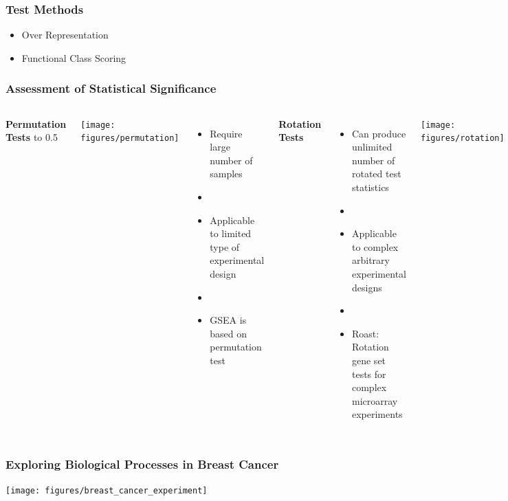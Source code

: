 \documentclass[9pt,t]{beamer}
\begin{document}
\begin{frame}
\frametitle{Test Methods}
		\begin{itemize}
		\item Over Representation
		\item Functional Class Scoring
		\end{itemize}
\end{frame}


\begin{frame}
	\frametitle{Assessment of Statistical Significance}
	\vspace{0.1cm}
	\begin{columns}
	\centering
    \textbf{\color{oxygenpurple} Permutation Tests}
	\vbox to 0.5\textheight
	{
	\vspace{0.02\textwidth}
	\centering
    \texttt{[image: figures/permutation]}                
	\vspace{0.02cm}
	\begin{itemize}
		\item Require large number of samples 
		\item[]
		\item Applicable to limited type of experimental design
		\item[]
		\item GSEA is based on permutation test
		\end{itemize}
    }                       
	\centering
	{\color{oxygenpurple}\textbf{Rotation Tests}}
	\begin{itemize}
	\item Can produce unlimited number of rotated test statistics
	\item[]
	\item Applicable to complex arbitrary experimental designs
	\item[]	
	\item Roast: Rotation gene set tests for complex microarray experiments
	\end{itemize}
	\vspace{0.02cm}
	\texttt{[image: figures/rotation]}
	\end{columns}
\end{frame}

\begin{frame}
	\frametitle{Exploring Biological Processes in Breast Cancer}
	\centering
	\texttt{[image: figures/breast\_cancer\_experiment]}
\end{frame}
\end{document}
